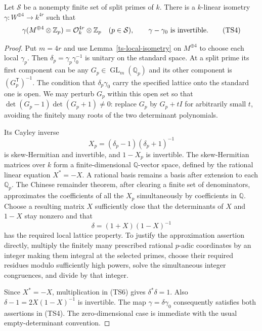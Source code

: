 \begin{theorem}\label{ts-approximation}
Let $\mathcal S$ be a nonempty finite set of split primes
of $k$.  There is a $k$-linear isometry
$\gamma:W^{\oplus4}\to k^{4r}$ such that
\[
 \gamma(M^{\oplus4}\otimes\mathbb Z_p)
          =\mathcal O_k^{4r}\otimes\mathbb Z_p
       \quad(p\in\mathcal S),\qquad
                   \gamma-\gamma_0\ \hbox{is invertible}.
 \tag{TS4}
\]
\end{theorem}
\begin{proof}
Put $m=4r$ and use Lemma~\ref{ts-local-isometry} on
$M^{\oplus4}$ to choose each local $\gamma_p$.
Then $\delta_p=\gamma_p\gamma_0^{-1}$ is unitary on
the standard space.
At a split prime its first component can be any
$G_p\in\operatorname{GL}_m(\mathbb Q_p)$ and its other
component is $(G_p^{\mathsf T})^{-1}$.
The condition that $\delta_p\gamma_0$ carry the specified
lattice onto the standard one is open.
We may perturb $G_p$ within this open set so that
$\det(G_p-1)\det(G_p+1)\ne0$:
replace $G_p$ by $G_p+tI$ for arbitrarily small $t$,
avoiding the finitely many roots of the two determinant
polynomials.

Its Cayley inverse
\[
                     X_p=(\delta_p-1)(\delta_p+1)^{-1}
 \tag{TS5}
\]
is skew-Hermitian and invertible, and $1-X_p$ is
invertible.
The skew-Hermitian matrices over $k$ form a finite-dimensional
$\mathbb Q$-vector space, defined by the rational linear
equation $X^*=-X$.  A rational basis remains a basis after
extension to each $\mathbb Q_p$.
The Chinese remainder theorem, after clearing a finite
set of denominators, approximates the coefficients of
all the $X_p$ simultaneously by coefficients in $\mathbb Q$.
Choose a resulting matrix $X$ sufficiently close that
the determinants of $X$ and $1-X$ stay nonzero and that
\[
                       \delta=(1+X)(1-X)^{-1}
 \tag{TS6}
\]
has the required local lattice property.
To justify the approximation assertion directly, multiply
the finitely many prescribed rational $p$-adic coordinates
by an integer making them integral at the selected primes,
choose their required residues modulo sufficiently high
powers, solve the simultaneous integer congruences, and
divide by that integer.

Since $X^*=-X$, multiplication in (TS6) gives
$\delta^*\delta=1$.
Also $\delta-1=2X(1-X)^{-1}$ is invertible.
The map $\gamma=\delta\gamma_0$ consequently satisfies
both assertions in (TS4).
The zero-dimensional case is immediate with the
usual empty-determinant convention.
\end{proof}

